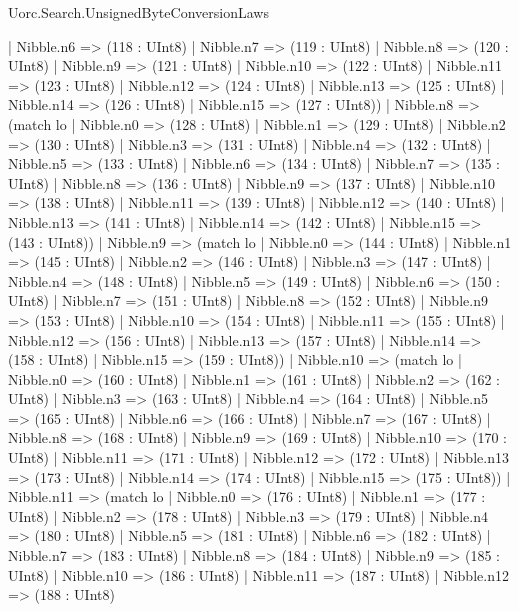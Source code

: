 \begin{lexlean}{Uorc.Search.UnsignedByteConversionLaws}
\begin{semanticmodule}
{      | Nibble.n6 => (118 : UInt8)
      | Nibble.n7 => (119 : UInt8)
      | Nibble.n8 => (120 : UInt8)
      | Nibble.n9 => (121 : UInt8)
      | Nibble.n10 => (122 : UInt8)
      | Nibble.n11 => (123 : UInt8)
      | Nibble.n12 => (124 : UInt8)
      | Nibble.n13 => (125 : UInt8)
      | Nibble.n14 => (126 : UInt8)
      | Nibble.n15 => (127 : UInt8))
    | Nibble.n8 => (match lo
      | Nibble.n0 => (128 : UInt8)
      | Nibble.n1 => (129 : UInt8)
      | Nibble.n2 => (130 : UInt8)
      | Nibble.n3 => (131 : UInt8)
      | Nibble.n4 => (132 : UInt8)
      | Nibble.n5 => (133 : UInt8)
      | Nibble.n6 => (134 : UInt8)
      | Nibble.n7 => (135 : UInt8)
      | Nibble.n8 => (136 : UInt8)
      | Nibble.n9 => (137 : UInt8)
      | Nibble.n10 => (138 : UInt8)
      | Nibble.n11 => (139 : UInt8)
      | Nibble.n12 => (140 : UInt8)
      | Nibble.n13 => (141 : UInt8)
      | Nibble.n14 => (142 : UInt8)
      | Nibble.n15 => (143 : UInt8))
    | Nibble.n9 => (match lo
      | Nibble.n0 => (144 : UInt8)
      | Nibble.n1 => (145 : UInt8)
      | Nibble.n2 => (146 : UInt8)
      | Nibble.n3 => (147 : UInt8)
      | Nibble.n4 => (148 : UInt8)
      | Nibble.n5 => (149 : UInt8)
      | Nibble.n6 => (150 : UInt8)
      | Nibble.n7 => (151 : UInt8)
      | Nibble.n8 => (152 : UInt8)
      | Nibble.n9 => (153 : UInt8)
      | Nibble.n10 => (154 : UInt8)
      | Nibble.n11 => (155 : UInt8)
      | Nibble.n12 => (156 : UInt8)
      | Nibble.n13 => (157 : UInt8)
      | Nibble.n14 => (158 : UInt8)
      | Nibble.n15 => (159 : UInt8))
    | Nibble.n10 => (match lo
      | Nibble.n0 => (160 : UInt8)
      | Nibble.n1 => (161 : UInt8)
      | Nibble.n2 => (162 : UInt8)
      | Nibble.n3 => (163 : UInt8)
      | Nibble.n4 => (164 : UInt8)
      | Nibble.n5 => (165 : UInt8)
      | Nibble.n6 => (166 : UInt8)
      | Nibble.n7 => (167 : UInt8)
      | Nibble.n8 => (168 : UInt8)
      | Nibble.n9 => (169 : UInt8)
      | Nibble.n10 => (170 : UInt8)
      | Nibble.n11 => (171 : UInt8)
      | Nibble.n12 => (172 : UInt8)
      | Nibble.n13 => (173 : UInt8)
      | Nibble.n14 => (174 : UInt8)
      | Nibble.n15 => (175 : UInt8))
    | Nibble.n11 => (match lo
      | Nibble.n0 => (176 : UInt8)
      | Nibble.n1 => (177 : UInt8)
      | Nibble.n2 => (178 : UInt8)
      | Nibble.n3 => (179 : UInt8)
      | Nibble.n4 => (180 : UInt8)
      | Nibble.n5 => (181 : UInt8)
      | Nibble.n6 => (182 : UInt8)
      | Nibble.n7 => (183 : UInt8)
      | Nibble.n8 => (184 : UInt8)
      | Nibble.n9 => (185 : UInt8)
      | Nibble.n10 => (186 : UInt8)
      | Nibble.n11 => (187 : UInt8)
      | Nibble.n12 => (188 : UInt8)
}
\end{semanticmodule}
\end{lexlean}
